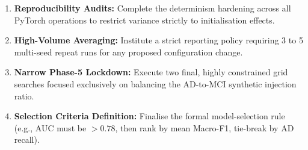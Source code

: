\documentclass[11pt, a4paper]{article}
\begin{document}
\begin{enumerate}[leftmargin=1.5em]
  \item \textbf{Reproducibility Audits:} Complete the determinism hardening across all PyTorch operations to restrict variance strictly to initialisation effects.
  \item \textbf{High-Volume Averaging:} Institute a strict reporting policy requiring 3 to 5 multi-seed repeat runs for any proposed configuration change.
  \item \textbf{Narrow Phase-5 Lockdown:} Execute two final, highly constrained grid searches focused exclusively on balancing the AD-to-MCI synthetic injection ratio.
  \item \textbf{Selection Criteria Definition:} Finalise the formal model-selection rule (e.g., AUC must be $>0.78$, then rank by mean Macro-F1, tie-break by AD recall).
\end{enumerate}
\end{document}
